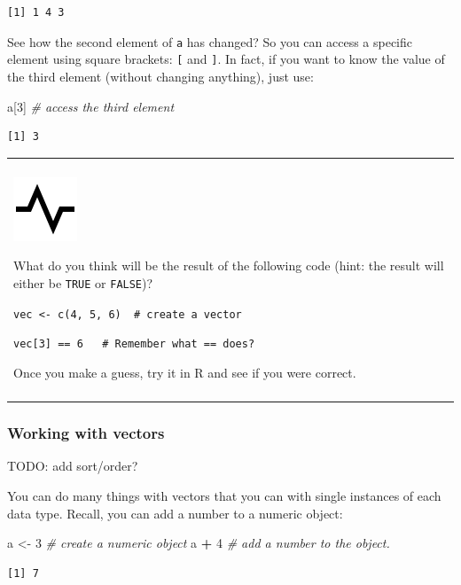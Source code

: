 \documentclass[
]{book}
\newenvironment{Shaded}{\begin{snugshade}}{\end{snugshade}}
\newcommand{\CommentTok}[1]{\textcolor[rgb]{0.56,0.35,0.01}{\textit{#1}}}
\newcommand{\DecValTok}[1]{\textcolor[rgb]{0.00,0.00,0.81}{#1}}
\newcommand{\NormalTok}[1]{#1}
\newcommand{\OperatorTok}[1]{\textcolor[rgb]{0.81,0.36,0.00}{\textbf{#1}}}
\newcommand{\StringTok}[1]{\textcolor[rgb]{0.31,0.60,0.02}{#1}}
\newenvironment{progress}
{
  \begin{center}
  \begin{tabular}{|>{\columncolor{progress}}p{0.9\textwidth}|}
  \hline\\
  \includegraphics[scale=0.1]{src/images/pulse-line.png}
}
{\\\\\hline
  \end{tabular}
  \end{center}
}
\begin{document}
\begin{verbatim}
[1] 1 4 3
\end{verbatim}

See how the second element of \texttt{a} has changed?
So you can access a specific element using square brackets: \texttt{{[}} and \texttt{{]}}.
In fact, if you want to know the value of the third element (without changing anything), just use:

\begin{Shaded}
\begin{Highlighting}[]
\NormalTok{a[}\DecValTok{3}\NormalTok{]    }\CommentTok{# access the third element}
\end{Highlighting}
\end{Shaded}

\begin{verbatim}
[1] 3
\end{verbatim}

\begin{progress}
What do you think will be the result of the following code (hint: the
result will either be \texttt{TRUE} or \texttt{FALSE})?

\texttt{vec\ \textless{}-\ c(4,\ 5,\ 6)\ \ \#\ create\ a\ vector}

\texttt{vec{[}3{]}\ ==\ 6\ \ \ \#\ Remember\ what\ ==\ does?}

Once you make a guess, try it in R and see if you were correct.
\end{progress}

\hypertarget{working-with-vectors}{%
\subsubsection{Working with vectors}\label{working-with-vectors}}

TODO: add sort/order?

You can do many things with vectors that you can with single instances of each data type.
Recall, you can add a number to a numeric object:

\begin{Shaded}
\begin{Highlighting}[]
\NormalTok{a <-}\StringTok{ }\DecValTok{3}   \CommentTok{# create a numeric object}
\NormalTok{a }\OperatorTok{+}\StringTok{ }\DecValTok{4}    \CommentTok{# add a number to the object.}
\end{Highlighting}
\end{Shaded}

\begin{verbatim}
[1] 7
\end{verbatim}
\end{document}
